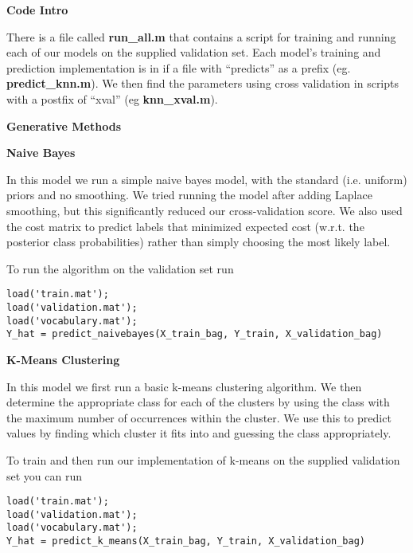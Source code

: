 \documentclass[12pt, a4paper]{article}
\title{}
\author{Tyler Altenhofen, Rohan Alur}
\date{}
\begin{document}
\maketitle

{\Large\textbf{Code Intro}}

There is a file called \textbf{run\_all.m} that contains a script for training and running each of our models on the supplied validation set. Each model's training and prediction implementation is in if a file with ``predicts'' as a prefix (eg. \textbf{predict\_knn.m}). We then find the parameters using cross validation in scripts with a postfix of ``xval'' (eg \textbf{knn\_xval.m}).

\vspace{5mm}

{\Large\textbf{Generative Methods}}

\vspace{3mm}

{\large\textbf{Naive Bayes}}

\vspace{3mm}
In this model we run a simple naive bayes model, with the standard (i.e. uniform) priors and no smoothing. We tried running the model after adding Laplace smoothing, but this significantly reduced our cross-validation score. We also used the cost matrix to predict labels that minimized expected cost (w.r.t. the posterior class probabilities) rather than simply choosing the most likely label. 

To run the algorithm on the validation set run
\begin{verbatim}
load('train.mat');
load('validation.mat');
load('vocabulary.mat');
Y_hat = predict_naivebayes(X_train_bag, Y_train, X_validation_bag)
\end{verbatim}

\vspace{3mm}
{\large\textbf{K-Means Clustering}}

\vspace{3mm}

In this model we first run a basic k-means clustering algorithm. We then determine the appropriate class for each of the clusters by using the class with the maximum number of occurrences within the cluster. We use this to predict values by finding which cluster it fits into and guessing the class appropriately. 

To train and then run our implementation of k-means on the supplied validation set you can run 
\begin{verbatim}
load('train.mat');
load('validation.mat');
load('vocabulary.mat');
Y_hat = predict_k_means(X_train_bag, Y_train, X_validation_bag)
\end{verbatim}
\end{document}
